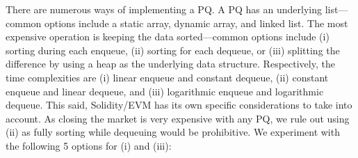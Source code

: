 There are numerous ways of implementing a PQ. A PQ has an underlying list---common options include a static array, dynamic array, and linked list. The most expensive operation is keeping the data sorted---common options include (i) sorting during each enqueue, (ii) sorting for each dequeue, or (iii) splitting the difference by using a heap as the underlying data structure. Respectively, the time complexities are (i) linear enqueue and constant dequeue, (ii) constant enqueue and linear dequeue, and (iii) logarithmic enqueue and logarithmic dequeue. This said, Solidity/EVM has its own specific considerations to take into account. As closing the market is very expensive with any PQ, we rule out using (ii) as fully sorting while dequeuing would be prohibitive. We experiment with the following 5 options for (i) and (iii):


